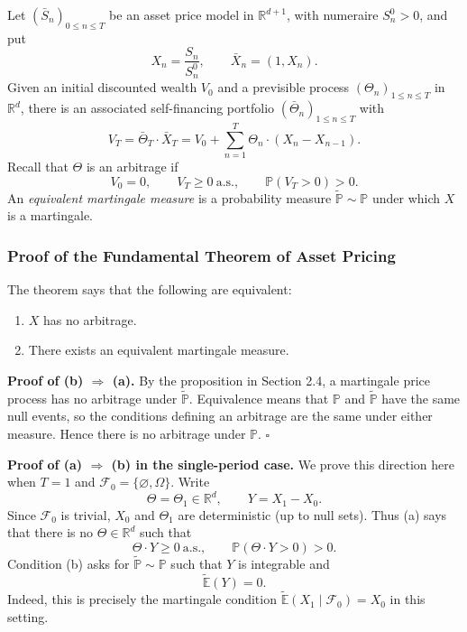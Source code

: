 \documentclass[11pt,a4paper]{article}
\begin{document}
Let $(\bar S_n)_{0\leq n\leq T}$ be an asset price model in
$\mathbb R^{d+1}$, with numeraire $S_n^0>0$, and put
\[
X_n=\frac{S_n}{S_n^0},\qquad \bar X_n=(1,X_n).
\]
Given an initial discounted wealth $V_0$ and a previsible process
$(\Theta_n)_{1\leq n\leq T}$ in $\mathbb R^d$, there is an associated
self-financing portfolio $(\bar\Theta_n)_{1\leq n\leq T}$ with
\[
V_T=\bar\Theta_T\cdot\bar X_T
=V_0+\sum_{n=1}^T\Theta_n\cdot(X_n-X_{n-1}).
\]
Recall that $\Theta$ is an arbitrage if
\[
V_0=0,\qquad V_T\geq0\ \text{a.s.},\qquad
\mathbb P(V_T>0)>0.
\]
An \emph{equivalent martingale measure} is a probability measure
$\widetilde{\mathbb P}\sim\mathbb P$ under which $X$ is a martingale.

\subsubsection*{Proof of the Fundamental Theorem of Asset Pricing}

The theorem says that the following are equivalent:
\begin{enumerate}
    \item[(a)] $X$ has no arbitrage.
    \item[(b)] There exists an equivalent martingale measure.
\end{enumerate}

\noindent\textbf{Proof of (b) $\Rightarrow$ (a).}
By the proposition in Section 2.4, a martingale price process has no
arbitrage under $\widetilde{\mathbb P}$. Equivalence means that
$\mathbb P$ and $\widetilde{\mathbb P}$ have the same null events, so the
conditions defining an arbitrage are the same under either measure.
Hence there is no arbitrage under $\mathbb P$.
\hfill$\square$

\medskip
\noindent\textbf{Proof of (a) $\Rightarrow$ (b) in the single-period case.}
We prove this direction here when $T=1$ and
$\mathcal F_0=\{\varnothing,\Omega\}$.
Write
\[
\Theta=\Theta_1\in\mathbb R^d,\qquad Y=X_1-X_0.
\]
Since $\mathcal F_0$ is trivial, $X_0$ and $\Theta_1$ are deterministic
(up to null sets). Thus (a) says that there is no $\Theta\in\mathbb R^d$
such that
\[
\Theta\cdot Y\geq0\ \text{a.s.},\qquad
\mathbb P(\Theta\cdot Y>0)>0.
\]
Condition (b) asks for $\widetilde{\mathbb P}\sim\mathbb P$ such that
$Y$ is integrable and
\[
\widetilde{\mathbb E}(Y)=0.
\]
Indeed, this is precisely the martingale condition
$\widetilde{\mathbb E}(X_1\mid\mathcal F_0)=X_0$ in this setting.
\end{document}
